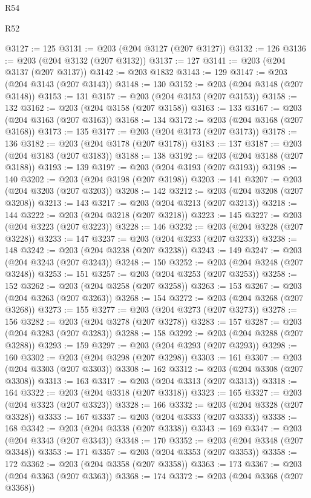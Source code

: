 \begin{lexlean}{R54}
\begin{lexlean}{R52}
\begin{coremodule}
{{{{{{{{{{{{{{{{{{{{{{{{{{{{{{{{{{{{{{{{{{{{{{{{{{{{{{{{{{{{{{{{{{{{{{{{{{{{{{{{{{{{{{{{{{{{{{{{{{{{{{{{{{{{{{{{{{{{{{{{{{{{{{{{{{{{{{{{{{{{{{{{{{{{{{{{{{{{{{{{{{{{{{{{{{{{{{{{{{{{{{{{{{{{{{{{{{{{{{@3127 := 125
@3131 := @203 (@204 @3127 (@207 @3127))
@3132 := 126
@3136 := @203 (@204 @3132 (@207 @3132))
@3137 := 127
@3141 := @203 (@204 @3137 (@207 @3137))
@3142 := @203 @1832
@3143 := 129
@3147 := @203 (@204 @3143 (@207 @3143))
@3148 := 130
@3152 := @203 (@204 @3148 (@207 @3148))
@3153 := 131
@3157 := @203 (@204 @3153 (@207 @3153))
@3158 := 132
@3162 := @203 (@204 @3158 (@207 @3158))
@3163 := 133
@3167 := @203 (@204 @3163 (@207 @3163))
@3168 := 134
@3172 := @203 (@204 @3168 (@207 @3168))
@3173 := 135
@3177 := @203 (@204 @3173 (@207 @3173))
@3178 := 136
@3182 := @203 (@204 @3178 (@207 @3178))
@3183 := 137
@3187 := @203 (@204 @3183 (@207 @3183))
@3188 := 138
@3192 := @203 (@204 @3188 (@207 @3188))
@3193 := 139
@3197 := @203 (@204 @3193 (@207 @3193))
@3198 := 140
@3202 := @203 (@204 @3198 (@207 @3198))
@3203 := 141
@3207 := @203 (@204 @3203 (@207 @3203))
@3208 := 142
@3212 := @203 (@204 @3208 (@207 @3208))
@3213 := 143
@3217 := @203 (@204 @3213 (@207 @3213))
@3218 := 144
@3222 := @203 (@204 @3218 (@207 @3218))
@3223 := 145
@3227 := @203 (@204 @3223 (@207 @3223))
@3228 := 146
@3232 := @203 (@204 @3228 (@207 @3228))
@3233 := 147
@3237 := @203 (@204 @3233 (@207 @3233))
@3238 := 148
@3242 := @203 (@204 @3238 (@207 @3238))
@3243 := 149
@3247 := @203 (@204 @3243 (@207 @3243))
@3248 := 150
@3252 := @203 (@204 @3248 (@207 @3248))
@3253 := 151
@3257 := @203 (@204 @3253 (@207 @3253))
@3258 := 152
@3262 := @203 (@204 @3258 (@207 @3258))
@3263 := 153
@3267 := @203 (@204 @3263 (@207 @3263))
@3268 := 154
@3272 := @203 (@204 @3268 (@207 @3268))
@3273 := 155
@3277 := @203 (@204 @3273 (@207 @3273))
@3278 := 156
@3282 := @203 (@204 @3278 (@207 @3278))
@3283 := 157
@3287 := @203 (@204 @3283 (@207 @3283))
@3288 := 158
@3292 := @203 (@204 @3288 (@207 @3288))
@3293 := 159
@3297 := @203 (@204 @3293 (@207 @3293))
@3298 := 160
@3302 := @203 (@204 @3298 (@207 @3298))
@3303 := 161
@3307 := @203 (@204 @3303 (@207 @3303))
@3308 := 162
@3312 := @203 (@204 @3308 (@207 @3308))
@3313 := 163
@3317 := @203 (@204 @3313 (@207 @3313))
@3318 := 164
@3322 := @203 (@204 @3318 (@207 @3318))
@3323 := 165
@3327 := @203 (@204 @3323 (@207 @3323))
@3328 := 166
@3332 := @203 (@204 @3328 (@207 @3328))
@3333 := 167
@3337 := @203 (@204 @3333 (@207 @3333))
@3338 := 168
@3342 := @203 (@204 @3338 (@207 @3338))
@3343 := 169
@3347 := @203 (@204 @3343 (@207 @3343))
@3348 := 170
@3352 := @203 (@204 @3348 (@207 @3348))
@3353 := 171
@3357 := @203 (@204 @3353 (@207 @3353))
@3358 := 172
@3362 := @203 (@204 @3358 (@207 @3358))
@3363 := 173
@3367 := @203 (@204 @3363 (@207 @3363))
@3368 := 174
@3372 := @203 (@204 @3368 (@207 @3368))
}}}}}}}}}}}}}}}}}}}}}}}}}}}}}}}}}}}}}}}}}}}}}}}}}}}}}}}}}}}}}}}}}}}}}}}}}}}}}}}}}}}}}}}}}}}}}}}}}}}}}}}}}}}}}}}}}}}}}}}}}}}}}}}}}}}}}}}}}}}}}}}}}}}}}}}}}}}}}}}}}}}}}}}}}}}}}}}}}}}}}}}}}}}}}}}}}}}}}}
\end{coremodule}
\end{lexlean}
\end{lexlean}
